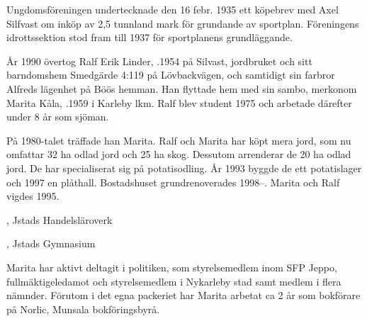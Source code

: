 {
Ungdomsföreningen undertecknade den 16 febr. 1935 ett köpebrev med Axel Silfvast om inköp av 2,5 tunnland mark för grundande av sportplan. Föreningens idrottssektion stod fram till 1937 för sportplanens grundläggande.






År 1990 övertog Ralf Erik Linder, .1954 på Silvast, jordbruket och sitt barndomshem Smedgärde 4:119 på Lövbackvägen, och samtidigt sin farbror Alfreds lägenhet på Böös hemman. Han flyttade hem med sin sambo, merkonom Marita Kåla, .1959 i Karleby lkm. Ralf blev student 1975 och arbetade därefter under 8 år som sjöman.

På 1980-talet träffade han Marita. Ralf och Marita har köpt mera jord, som nu omfattar 32 ha odlad jord och 25 ha skog. Dessutom arrenderar de 20 ha odlad jord. De har specialiserat sig på potatisodling. År 1993 byggde de ett potatislager och 1997 en plåthall. Bostadshuset grundrenoverades 1998--. Marita och Ralf vigdes 1995.
\begin{jhchildren}
  \item {}, Jstads Handelsläroverk
  \item {}, Jstads Gymnasium
\end{jhchildren}
Marita har aktivt deltagit i politiken, som styrelsemedlem inom SFP Jeppo, fullmäktigeledamot och styrelsemedlem i Nykarleby stad samt medlem i flera nämnder. Förutom i det egna packeriet har Marita arbetat ca 2 år som bokförare på Norlic, Munsala bokföringsbyrå.


}

